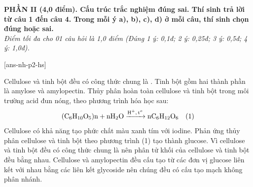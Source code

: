\documentclass[11pt,a4paper]{article}
\begin{document}

\vspace{5pt}
\noindent
\textbf{\color{mainGreen}PHẦN II (4,0 điểm). Cấu trúc trắc nghiệm đúng sai. Thí sinh trả lời từ câu 1 đến câu 4. Trong mỗi ý a), b), c), d) ở mỗi câu, thí sinh chọn đúng hoặc sai.}\\
\textit{Điểm tối đa cho 01 câu hỏi là 1,0 điểm (Đúng 1 ý: 0,1đ; 2 ý: 0,25đ; 3 ý: 0,5đ; 4 ý: 1,0đ).}

[ans-nh-p2-hs]

\begin{ex}
Cellulose và tinh bột đều có công thức chung là . Tinh bột gồm hai thành phần là amylose và amylopectin. Thủy phân hoàn toàn cellulose và tinh bột trong môi trường acid đun nóng, theo phương trình hóa học sau:
$$\ce{(C6H10O5)n + nH2O ->[H^+, t^o] nC6H12O6}\quad (1)$$
\choiceTF
{Cellulose có khả năng tạo phức chất màu xanh tím với iodine.}
{\True Phản ứng thủy phân cellulose và tinh bột theo phương trình (1) tạo thành glucose.}
{Vì cellulose và tinh bột đều có công thức chung là  nên phân tử khối của cellulose và tinh bột đều bằng nhau.}
{Cellulose và amylopectin đều cấu tạo từ các đơn vị glucose liên kết với nhau bằng các liên kết glycoside nên chúng đều có cấu tạo mạch không phân nhánh.}

\end{ex}
\end{document}

